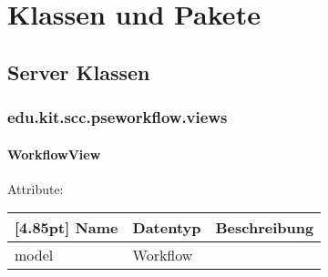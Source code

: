 \chapter{Klassen und Pakete}

%            


%

    \section{Server Klassen}

    \subsection{edu.kit.scc.pseworkflow.views}

		\subsubsection{WorkflowView}

        Attribute:
        \begin{center}
        	\renewcommand{\arraystretch}{1.5}
            \setlength\tabcolsep{5pt}
        	\begin{tabularx}{\textwidth}{|l|l|X|}
        		\hline
                \rowcolor[gray]{0.75}[4.85pt]            		
        	    Name & Datentyp & Beschreibung \\ \hline
        	    model & Workflow &  \\ \hline		
        	\end{tabularx}
        \end{center}
        
